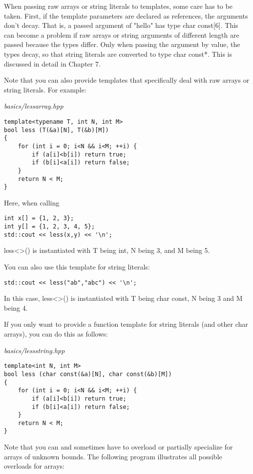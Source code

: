 When passing raw arrays or string literals to templates, some care has to be taken. First, if the template parameters are declared as references, the arguments don’t decay. That is, a passed argument of "hello" has type char const[6]. This can become a problem if raw arrays or string arguments of different length are passed because the types differ. Only when passing the argument by value, the types decay, so that string literals are converted to type char const*. This is discussed in detail in Chapter 7.

Note that you can also provide templates that specifically deal with raw arrays or string literals. For example:

\noindent
\textit{basics/lessarray.hpp}
\begin{lstlisting}[style=styleCXX]
template<typename T, int N, int M>
bool less (T(&a)[N], T(&b)[M])
{
	for (int i = 0; i<N && i<M; ++i) {
		if (a[i]<b[i]) return true;
		if (b[i]<a[i]) return false;
	}
	return N < M;
}
\end{lstlisting}

Here, when calling

\begin{lstlisting}[style=styleCXX]
int x[] = {1, 2, 3};
int y[] = {1, 2, 3, 4, 5};
std::cout << less(x,y) << '\n';
\end{lstlisting}

less<>() is instantiated with T being int, N being 3, and M being 5.

You can also use this template for string literals:

\begin{lstlisting}[style=styleCXX]
std::cout << less("ab","abc") << '\n';
\end{lstlisting}

In this case, less<>() is instantiated with T being char const, N being 3 and M being 4.

If you only want to provide a function template for string literals (and other char arrays), you can do this as follows:

\noindent
\textit{basics/lessstring.hpp}
\begin{lstlisting}[style=styleCXX]
template<int N, int M>
bool less (char const(&a)[N], char const(&b)[M])
{
	for (int i = 0; i<N && i<M; ++i) {
		if (a[i]<b[i]) return true;
		if (b[i]<a[i]) return false;
	}
	return N < M;
}
\end{lstlisting}

Note that you can and sometimes have to overload or partially specialize for arrays of unknown bounds. The following program illustrates all possible overloads for arrays:

